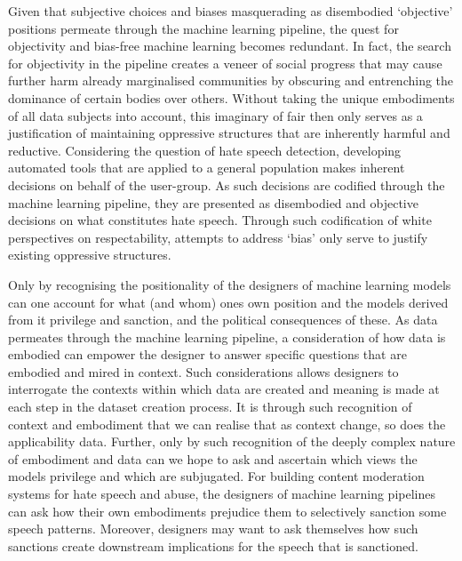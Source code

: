 Given that subjective choices and biases masquerading as disembodied `objective' positions permeate through the machine learning pipeline, the quest for objectivity and bias-free machine learning becomes redundant. In fact, the search for objectivity in the pipeline creates a veneer of social progress that may cause further harm already marginalised communities by obscuring and entrenching the dominance of certain bodies over others. Without taking the unique embodiments of all data subjects into account, this imaginary of fair then only serves as a justification of maintaining oppressive structures that are inherently harmful and reductive. Considering the question of hate speech detection, developing automated tools that are applied to a general population makes inherent decisions on behalf of the user-group. As such decisions are codified through the machine learning pipeline, they are presented as disembodied and objective decisions on what constitutes hate speech. Through such codification of white perspectives on respectability, attempts to address `bias' only serve to justify existing oppressive structures.

Only by recognising the positionality of the designers of machine learning models can one account for what (and whom) ones own position and the models derived from it privilege and sanction, and the political consequences of these. As data permeates through the machine learning pipeline, a consideration of how data is embodied can empower the designer to answer specific questions that are embodied and mired in context. Such considerations allows designers to interrogate the contexts within which data are created and meaning is made at each step in the dataset creation process. It is through such recognition of context and embodiment that we can realise that as context change, so does the applicability data. Further, only by such recognition of the deeply complex nature of embodiment and data can we hope to ask and ascertain which views the models privilege and which are subjugated. For building content moderation systems for hate speech and abuse, the designers of machine learning pipelines can ask how their own embodiments prejudice them to selectively sanction some speech patterns. Moreover, designers may want to ask themselves how such sanctions create downstream implications for the speech that is sanctioned.

